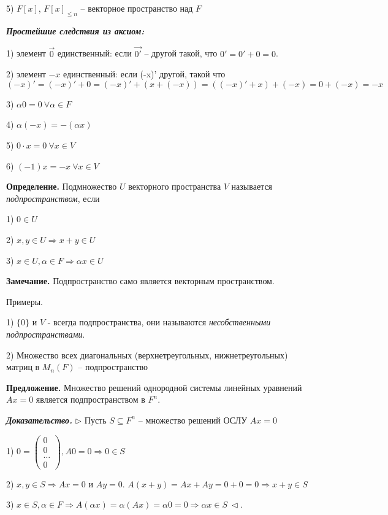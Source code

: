5) $F[x]$, $F[x]_{\leq n}$ -- векторное пространство над $F$

\bigskip
\textbf{\textit{Простейшие следствия из аксиом:}}

1) элемент $\overrightarrow{0}$ единственный: если $\overrightarrow{0'}$ -- другой такой, что $0' = 0' + 0 = 0$. 

2) элемент $-x$ единственный: если (-x)' другой, такой что $(-x)' = (-x)' + 0 = (-x)' + (x + (-x)) = ((-x)' + x) + (-x) = 0 + (-x) = -x$

3) $\alpha 0 = 0 \ \forall \alpha \in F$

4) $\alpha (-x) = -(\alpha x)$

5) $0 \cdot x = 0 \ \forall x \in V$

6) $(-1)x = -x \ \forall x \in V$

\bigskip
\textbf{Определение.} Подмножество $U$ векторного пространства $V$ называется \textit{подпространством}, если

1) $0 \in U$

2) $x, y \in U \Rightarrow x + y \in U$

3) $x \in U, \alpha \in F \Rightarrow \alpha x \in U$

\bigskip
\textbf{Замечание.} Подпространство само является векторным пространством.

\bigskip
Примеры.

1) $\{0\}$ и $V$ - всегда подпространства, они называются \textit{несобственными подпространствами}.

2) Множество всех диагональных (верхнетреугольных, нижнетреугольных) матриц в $M_n (F)$ -- подпространство

\bigskip
\textbf{Предложение.} Множество решений однородной системы линейных уравнений $Ax = 0$ является подпространством в $F^n$.

\bigskip
\textbf{\textit{Доказательство.}} $\rhd$ Пусть $S \subseteq F^n$ -- множество решений ОСЛУ $Ax = 0$

1) $0 = \begin{pmatrix} 0 \\ 0 \\ \dots \\ 0 \end{pmatrix}, A0 = 0 \Rightarrow 0 \in S$

2) $x, y \in S \Rightarrow Ax = 0$ и $Ay = 0$. $A(x+y) = Ax + Ay = 0 + 0 = 0 \Rightarrow x + y \in S$

3) $x \in S, \alpha \in F \Rightarrow A(\alpha x) = \alpha (Ax) = \alpha 0 = 0 \Rightarrow \alpha x \in S \ \lhd$.

